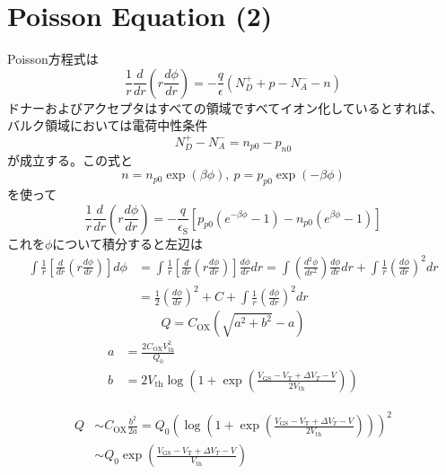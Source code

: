 \documentclass[11pt,uplatex]{jsarticle}
\def\d#1#2{\frac{d #1}{d #2}}
\def\dd#1#2{\frac{d^2 #1}{d #2^2}}
\begin{document}
\section{Poisson Equation (2)}
Poisson方程式は
\begin{equation}
 \frac{1}{r}\d{}{r}(r\d{\phi}{r}) =  -\frac{q}{\epsilon}
  (N_D^+ + p - N_A^- - n)
\end{equation}
ドナーおよびアクセプタはすべての領域ですべてイオン化しているとすれば、
バルク領域においては電荷中性条件
\begin{equation}
 N_D^+ - N_A^- = n_{p0}-p_{n0}
\end{equation}
が成立する。この式と
\begin{equation}
 n=n_{p0} \exp(\beta \phi),\ p = p_{p0} \exp(-\beta\phi)
\end{equation}
を使って
\begin{equation}
 \frac{1}{r}\d{}{r}(r\d{\phi}{r})
  =-\frac{q}{\epsilon_{\mathrm{S}}}
[p_{p0}(e^{-\beta \phi} -1) - n_{p0} (e^{\beta \phi} -1)]
\end{equation}
これを$\phi$について積分すると左辺は
\begin{subequations}
\begin{align}
\int \frac{1}{r}[\d{}{r}(r \d{\phi}{r})]d\phi
  & =
  \int \frac{1}{r}[\d{}{r}(r \d{\phi}{r})]\d{\phi}{r} dr
  =\int (\dd{\phi}{r})\d{\phi}{r} d r +
  \int \frac{1}{r}(\d{\phi}{r})^2 dr \\
&= \frac{1}{2}(\d{\phi}{r})^2 + C + \int \frac{1}{r}(\d{\phi}{r})^2 dr 
\end{align}
\end{subequations}
\begin{equation}
 Q=C_{\mathrm{OX}}
  \left(
   \sqrt{a^2+b^2}-a
  \right)
\end{equation}
\begin{subequations}
\begin{align}
 a&=\frac{2 C_{\mathrm{OX}}V_{\mathrm{th}}^2}{Q_0} \\
 b&=2 V_{\mathrm{th}} \log
 \left(1+\exp
 \left(\frac{V_{\mathrm{GS}}-V_{\mathrm{T}}+\Delta V_{T}-V}{2 V_{\mathrm{th}}} 
 \right)
 \right)
\end{align}
\end{subequations}

\begin{subequations}
\begin{align}
 Q&\sim C_{\mathrm{OX}}\frac{b^2}{2a}
  =  Q_0 \left( \log \left(1+\exp \left(\frac{V_{\mathrm{GS}}-V_{\mathrm{T}}+\Delta V_{T}-V}{2 V_{\mathrm{th}}}  \right)
					\right)\right)^2 \\
 &\sim Q_0 \exp \left(\frac{V_{\mathrm{GS}}-V_{\mathrm{T}}+\Delta V_{T}-V}{V_{\mathrm{th}}}\right)
\end{align}
\end{subequations}
\end{document}

